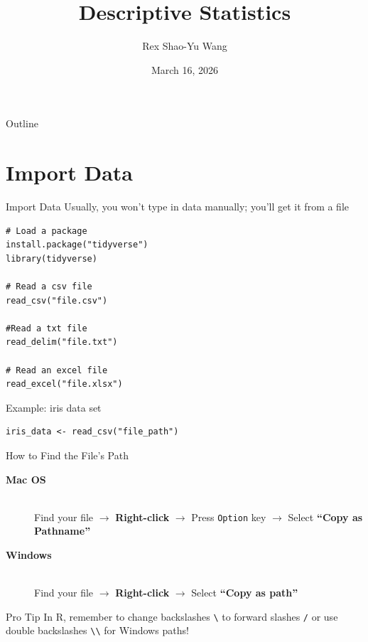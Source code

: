 \documentclass{beamer}					%
\title{Descriptive Statistics}	%
\author{Rex Shao-Yu Wang}								%
\institute{Department of Agronomy, National Taiwan University}					%
\date{March 16, 2026}									%
\begin{document}
\begin{frame}
  \titlepage
\end{frame}

\begin{frame}{Outline}
  \tableofcontents
\end{frame}

\section{Import Data}
\begin{frame}[fragile]{Import Data}
Usually, you won't type in data manually; you'll get it from a file
\begin{lstlisting}
# Load a package
install.package("tidyverse")
library(tidyverse)

# Read a csv file
read_csv("file.csv")

#Read a txt file
read_delim("file.txt")

# Read an excel file
read_excel("file.xlsx") 

\end{lstlisting}

Example: iris data set
\begin{lstlisting}
iris_data <- read_csv("file_path")
\end{lstlisting}
\end{frame}

\begin{frame}{How to Find the File's Path}
    \begin{description}
        \item[\textbf{Mac OS}] \hfill \\
        Find your file $\rightarrow$ \textbf{Right-click} $\rightarrow$ Press \texttt{Option} key $\rightarrow$ Select \textbf{“Copy as Pathname”}
        
        \vspace{1.5em} %
        
        \item[\textbf{Windows}] \hfill \\
        Find your file $\rightarrow$ \textbf{Right-click} $\rightarrow$ Select \textbf{“Copy as path”} \\
    \end{description}

    \vspace{2em}
    
    \begin{exampleblock}{Pro Tip}
        In R, remember to change backslashes \texttt{\textbackslash} to forward slashes \texttt{/} or use double backslashes \texttt{\textbackslash\textbackslash} for Windows paths!
    \end{exampleblock}
\end{frame}
\end{document}
